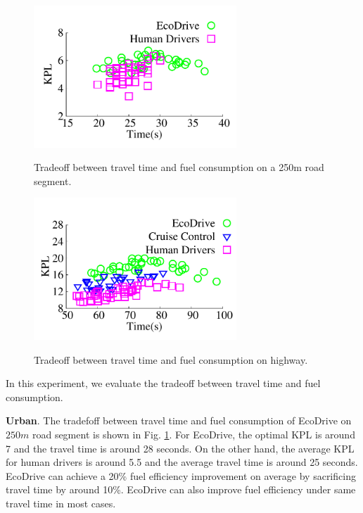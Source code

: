 \begin{figure}[!htbp]
\begin{center}
\vspace{-0.4cm}
\includegraphics[width=3.0in,angle=0]{Figs/EcoDrive/evaluation/urban_timekpl.pdf}
\vspace{-0.0cm}
\caption{Tradeoff between travel time and fuel consumption on a 250m road segment.}
\vspace{-0.6cm}
\label{tradeoff_urban}
\end{center}
\end{figure}

\begin{figure}[!htbp]
\begin{center}
\vspace{-0.4cm}
\includegraphics[width=3.0in,angle=0]{Figs/EcoDrive/evaluation/highway_timekpl.pdf}
\vspace{-0.0cm}
\caption{Tradeoff between travel time and fuel consumption on highway.}
\vspace{-0.6cm}
\label{tradeoff_highway}
\end{center}
\end{figure}

In this experiment, we evaluate the tradeoff between travel time and fuel consumption. 

\textbf{Urban}. 
The tradefoff between travel time and fuel consumption of EcoDrive on $250m$ 
road segment is shown in Fig. \ref{tradeoff_urban}. For EcoDrive, the optimal KPL is around 7 and the 
travel time is around 28 seconds. On the other hand, the average KPL for human 
drivers is around 5.5 and the average travel time is around 25 seconds. 
EcoDrive can achieve a 20\% fuel efficiency improvement 
on average by sacrificing travel time by around 10\%. 
EcoDrive can also improve fuel efficiency under same travel time in most cases. 

